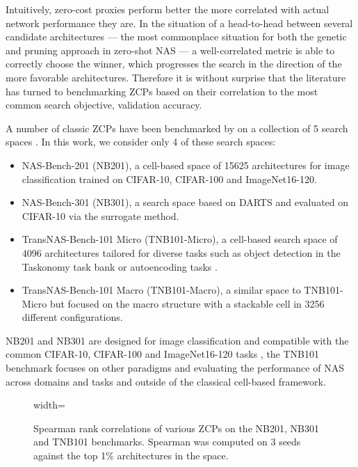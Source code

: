 \documentclass[10pt]{article} %
\begin{document}
Intuitively, zero-cost proxies perform better the more correlated with actual network performance they are. In the situation of a head-to-head between several candidate architectures --- the most commonplace situation for both the genetic and pruning approach in zero-shot NAS --- a well-correlated metric is able to correctly choose the winner, which progresses the search in the direction of the more favorable architectures. Therefore it is without surprise that the literature has turned to benchmarking ZCPs based on their correlation to the most common search objective, validation accuracy.

A number of classic ZCPs have been benchmarked by \citet{krishnakumar2022bench} on a collection of 5 search spaces \citep{ying2019bench, dong2020bench, siems2020bench, duan2021transnas}. In this work, we consider only 4 of these search spaces:
\begin{itemize}
\item NAS-Bench-201 \citep{dong2020bench} (NB201), a cell-based space of 15625 architectures for image classification trained on CIFAR-10, CIFAR-100 and ImageNet16-120.
\item NAS-Bench-301 \citep{siems2020bench} (NB301), a search space based on DARTS \citep{liu2018darts} and evaluated on CIFAR-10 via the surrogate method.
\item TransNAS-Bench-101 Micro \citep{duan2021transnas} (TNB101-Micro), a cell-based search space of 4096 architectures tailored for diverse tasks such as object detection in the Taskonomy task bank \citep{zamir2018taskonomy} or autoencoding tasks \citep{krishnakumar2022bench}.
\item TransNAS-Bench-101 Macro \citep{duan2021transnas} (TNB101-Macro), a similar space to TNB101-Micro but focused on the macro structure with a stackable cell in 3256 different configurations.
\end{itemize}
NB201 and NB301 are designed for image classification and compatible with the common CIFAR-10, CIFAR-100 and ImageNet16-120 tasks \citep{krizhevsky2009learning, deng2009imagenet,chrabaszcz2017downsampled}, the TNB101 benchmark focuses on other paradigms and evaluating the performance of NAS across domains and tasks and outside of the classical cell-based framework.
\begin{figure}[t]
\begin{adjustbox}{width=\linewidth}
    
\end{adjustbox}
\caption{\centering Spearman rank correlations of various ZCPs on the NB201, NB301 and TNB101 benchmarks. Spearman was computed on 3 seeds against the top 1\% architectures in the space.}
\label{fig_bench_corr_top}
\end{figure}
\end{document}
